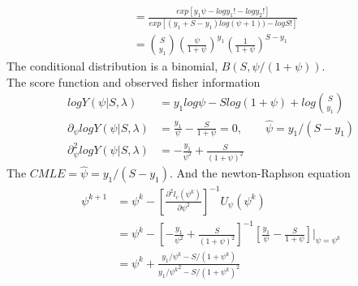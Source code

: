 \documentclass[11pt]{article} %
\begin{document}
\begin{itemize}
\begin{itemize}
\begin{align*}
			&= \frac{exp \left[ y_1 \psi -log y_1! - log y_2! \right] }{exp \left[ (y_1+ S-y_1) log(\psi + 1)) -log S!  \right]}\\
			&= {S \choose y_1} \left( \frac{\psi}{1+\psi}\right)^{y_1} \left(\frac{1}{1+\psi} \right)^{S-y_1}
		\end{align*}
		The conditional distribution is a binomial, $B(S, \psi/(1+\psi))$.\\
		The score function and observed fisher information 
		\begin{align*}
			log Y(\psi|S,\lambda) &= y_1 log \psi -S log(1+\psi) + log {S \choose y_1} \\
			\partial_{\psi} log Y(\psi|S,\lambda) &= \frac{y_1}{\psi} - \frac{S}{1+\psi} = 0, \qquad \hat{\psi} = y_1/(S-y_1)\\
			\partial^2_{\psi} log Y(\psi|S,\lambda) &= -\frac{y_1}{\psi^2} + \frac{S}{(1+\psi)^2}
		\end{align*}
		The $CMLE = \hat{\psi} = y_1/(S-y_1)$. And the newton-Raphson equation 
		\begin{align*}
			\psi^{k+1} &= \psi^{k} - \left[\frac{\partial^2 l_c(\psi^{k})}{\partial \psi^2} \right]^{-1} U_{\psi}(\psi^{k})\\
			&= \psi^{k} - \left[ -\frac{y_1}{\psi^2} + \frac{S}{(1+\psi)^2}\right]^{-1} \left[\frac{y_1}{\psi} - \frac{S}{1+\psi} \right]|_{\psi = \psi^{k}}\\
			&=  \psi^{k} + \frac{y_1/\psi^{k} - S/(1+\psi^{k})}{y_1/{\psi^{k}}^2 - S/(1+\psi^{k})^2}
		\end{align*}
	\end{itemize}
\end{itemize}
\end{document}
